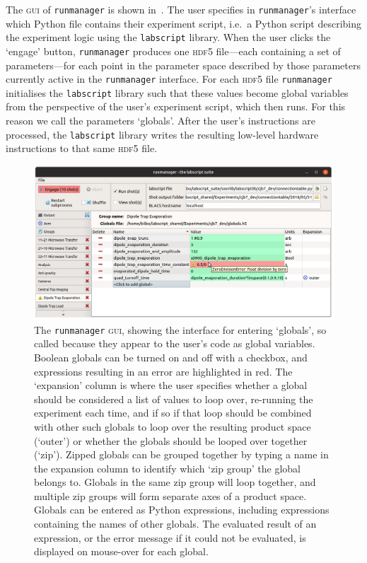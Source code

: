 The \textsc{gui} of \texttt{runmanager} is shown in~. The user specifies in \texttt{runmanager}'s interface which Python file contains their experiment script, i.e.~a Python script describing the experiment logic using the \texttt{labscript} library. When the user clicks the `engage' button, \texttt{runmanager} produces one \textsc{hdf5} file---each containing a set of parameters---for each point in the parameter space described by those parameters currently active in the \texttt{runmanager} interface. For each \textsc{hdf5} file \texttt{runmanager} initialises the \texttt{labscript} library such that these values become global variables from the perspective of the user's experiment script, which then runs. For this reason we call the parameters `globals'. After the user's instructions are processed, the \texttt{labscript} library writes the resulting low-level hardware instructions to that same \textsc{hdf5} file.

\begin{figure}[t]
\begin{center}
\includegraphics[width=\textwidth]{figures/software/new_screenshots/runmanager.png}
\caption{The \texttt{runmanager} \textsc{gui}, showing the interface for entering `globals', so called because they appear to the user's code as global variables. Boolean globals can be turned on and off with a checkbox, and expressions resulting in an error are highlighted in red. The `expansion' column is where the user specifies whether a global should be considered a list of values to loop over, re-running the experiment each time, and if so if that loop should be combined with other such globals to loop over the resulting product space (`outer') or whether the globals should be looped over together (`zip'\protect\footnotemark). Zipped globals can be grouped together by typing a name in the expansion column to identify which `zip group' the global belongs to. Globals in the same zip group will loop together, and multiple zip groups will form separate axes of a product space. Globals can be entered as Python expressions, including expressions containing the names of other globals. The evaluated result of an expression, or the error message if it could not be evaluated, is displayed on mouse-over for each global.}\label{fig:runmanager}
\end{center}
\end{figure}

